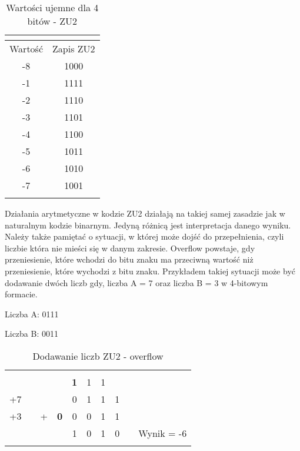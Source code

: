 \documentclass[12pt, a4paper, onside, polish]{article}				%
\begin{document}
\begin{table}[htb]
\caption{Wartości ujemne dla 4 bitów - ZU2}
\centering
\begin{tabular}{cc}
\multicolumn{1}{l}{} & \multicolumn{1}{l}{} \\ \hline
\multicolumn{1}{|c|}{Wartość} & \multicolumn{1}{c|}{Zapis ZU2} \\ \hline
\multicolumn{1}{|c|}{-8} & \multicolumn{1}{c|}{1000} \\ \hline
\multicolumn{1}{|c|}{-1} & \multicolumn{1}{c|}{1111} \\ \hline
\multicolumn{1}{|c|}{-2} & \multicolumn{1}{c|}{1110} \\ \hline
\multicolumn{1}{|c|}{-3} & \multicolumn{1}{c|}{1101} \\ \hline
\multicolumn{1}{|c|}{-4} & \multicolumn{1}{c|}{1100} \\ \hline
\multicolumn{1}{|c|}{-5} & \multicolumn{1}{c|}{1011} \\ \hline
\multicolumn{1}{|c|}{-6} & \multicolumn{1}{c|}{1010} \\ \hline
\multicolumn{1}{|c|}{-7} & \multicolumn{1}{c|}{1001} \\ \hline
\multicolumn{1}{l}{} & \multicolumn{1}{l}{}
\end{tabular}
\end{table}

\cleardoublepage
Działania arytmetyczne w kodzie ZU2 działają na takiej samej zasadzie jak w naturalnym kodzie binarnym. Jedyną różnicą jest interpretacja danego wyniku. Należy także pamiętać o sytuacji, w której może dojść do przepełnienia, czyli liczbie która nie mieści się w danym zakresie. Overflow powstaje, gdy przeniesienie, które wchodzi do bitu znaku ma przeciwną wartość niż przeniesienie, które wychodzi z bitu znaku.  Przykładem takiej sytuacji może być dodawanie dwóch liczb gdy, liczba A = 7 oraz liczba B = 3 w 4-bitowym formacie.


\vspace{5mm}
Liczba A: 0111

Liczba B: 0011
\begin{table}[htb]
\caption{Dodawanie liczb ZU2 - overflow}
\centering
\begin{tabular}{cclcccccll}
\multicolumn{1}{l}{} & \multicolumn{1}{l}{} &  & \multicolumn{1}{l}{} & \multicolumn{1}{l}{} & \multicolumn{1}{l}{} & \multicolumn{1}{l}{} & \multicolumn{1}{l}{} &  &  \\
 &  &  &  & {\color[HTML]{000000} \textbf{1}} & 1 & 1 &  &  &  \\
+7 &  &  &  & 0 & 1 & 1 & 1 &  &  \\
+3 &  & + & \textbf{0} & 0 & 0 & 1 & 1 &  &  \\ \cline{3-8}
 &  &  &  & 1 & 0 & 1 & 0 &  & Wynik = -6 \\
\multicolumn{1}{l}{} & \multicolumn{1}{l}{} &  & \multicolumn{1}{l}{} & \multicolumn{1}{l}{} & \multicolumn{1}{l}{} & \multicolumn{1}{l}{} & \multicolumn{1}{l}{} &  & 
\end{tabular}
\end{table}
\end{document}
